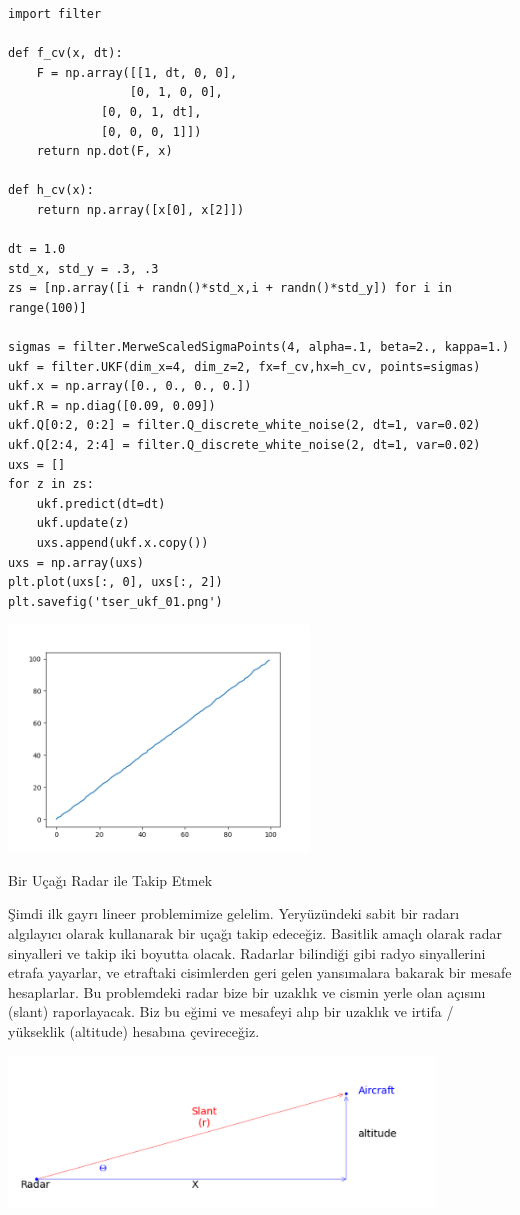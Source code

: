\documentclass[12pt,fleqn]{article}\usepackage{../../common}
\begin{document}
\begin{verbatim}
import filter

def f_cv(x, dt):
    F = np.array([[1, dt, 0, 0],
                 [0, 1, 0, 0],
	      	 [0, 0, 1, dt],
	      	 [0, 0, 0, 1]])
    return np.dot(F, x)

def h_cv(x):
    return np.array([x[0], x[2]])

dt = 1.0
std_x, std_y = .3, .3
zs = [np.array([i + randn()*std_x,i + randn()*std_y]) for i in range(100)]

sigmas = filter.MerweScaledSigmaPoints(4, alpha=.1, beta=2., kappa=1.)
ukf = filter.UKF(dim_x=4, dim_z=2, fx=f_cv,hx=h_cv, points=sigmas)
ukf.x = np.array([0., 0., 0., 0.])
ukf.R = np.diag([0.09, 0.09])
ukf.Q[0:2, 0:2] = filter.Q_discrete_white_noise(2, dt=1, var=0.02)
ukf.Q[2:4, 2:4] = filter.Q_discrete_white_noise(2, dt=1, var=0.02)
uxs = []
for z in zs:
    ukf.predict(dt=dt)
    ukf.update(z)
    uxs.append(ukf.x.copy())
uxs = np.array(uxs)
plt.plot(uxs[:, 0], uxs[:, 2])
plt.savefig('tser_ukf_01.png')
\end{verbatim}

\includegraphics[height=6cm]{tser_ukf_01.png}

Bir Uçağı Radar ile Takip Etmek

Şimdi ilk gayrı lineer problemimize gelelim. Yeryüzündeki sabit bir radarı
algılayıcı olarak kullanarak bir uçağı takip edeceğiz. Basitlik amaçlı
olarak radar sinyalleri ve takip iki boyutta olacak. Radarlar bilindiği
gibi radyo sinyallerini etrafa yayarlar, ve etraftaki cisimlerden geri
gelen yansımalara bakarak bir mesafe hesaplarlar. Bu problemdeki radar bize
bir uzaklık ve cismin yerle olan açısını (slant) raporlayacak. Biz bu eğimi
ve mesafeyi alıp bir uzaklık ve irtifa / yükseklik (altitude) hesabına
çevireceğiz.

\includegraphics[height=4cm]{tser_ukf_07.png}
\end{document}
